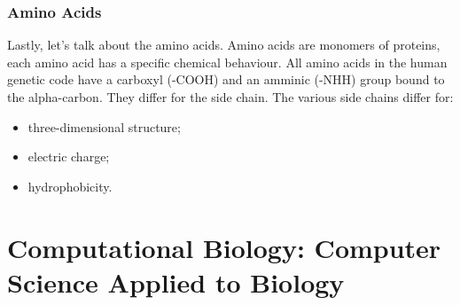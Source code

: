\subsubsection{Amino Acids}
Lastly, let's talk about the amino acids.
Amino acids are monomers of proteins, each amino acid has a specific chemical behaviour.
All amino acids in the human genetic code have a carboxyl (-COOH) and an amminic (-NHH) group bound to the alpha-carbon. They differ for the side chain. 
The various side chains differ for:
\begin{itemize}
	\item three-dimensional structure;
	\item electric charge;
	\item hydrophobicity.
\end{itemize}

\section{Computational Biology: Computer Science Applied to Biology}
